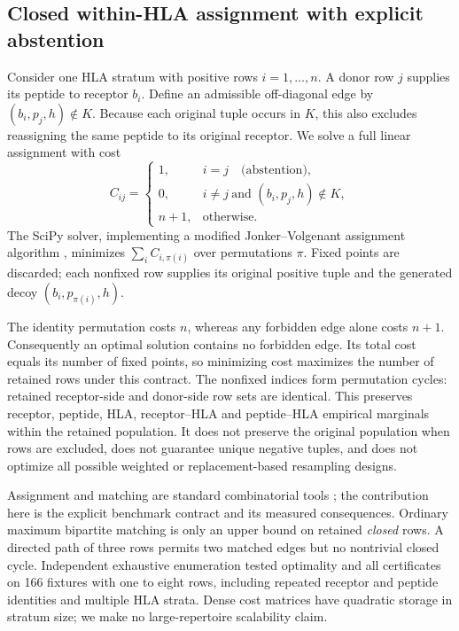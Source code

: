 \documentclass[pdflatex,sn-basic,Numbered]{sn-jnl}
\begin{document}
\subsection{Closed within-HLA assignment with explicit abstention}
Consider one HLA stratum with positive rows $i=1,\ldots,n$. A donor row $j$ supplies its peptide to receptor $b_i$. Define an admissible off-diagonal edge by $(b_i,p_j,h)\notin K$. Because each original tuple occurs in $K$, this also excludes reassigning the same peptide to its original receptor. We solve a full linear assignment with cost
\begin{equation}
C_{ij}=\begin{cases}
1, & i=j\quad\text{(abstention)},\\
0, & i\ne j\ \text{and }(b_i,p_j,h)\notin K,\\
n+1, & \text{otherwise}.
\end{cases}
\label{eq:assignment}
\end{equation}
The SciPy solver, implementing a modified Jonker--Volgenant assignment algorithm \cite{Crouse2016}, minimizes $\sum_i C_{i,\pi(i)}$ over permutations $\pi$. Fixed points are discarded; each nonfixed row supplies its original positive tuple and the generated decoy $(b_i,p_{\pi(i)},h)$.

The identity permutation costs $n$, whereas any forbidden edge alone costs $n+1$. Consequently an optimal solution contains no forbidden edge. Its total cost equals its number of fixed points, so minimizing cost maximizes the number of retained rows under this contract. The nonfixed indices form permutation cycles: retained receptor-side and donor-side row sets are identical. This preserves receptor, peptide, HLA, receptor--HLA and peptide--HLA empirical marginals within the retained population. It does not preserve the original population when rows are excluded, does not guarantee unique negative tuples, and does not optimize all possible weighted or replacement-based resampling designs.

Assignment and matching are standard combinatorial tools \cite{Hall1935}; the contribution here is the explicit benchmark contract and its measured consequences. Ordinary maximum bipartite matching is only an upper bound on retained \emph{closed} rows. A directed path of three rows permits two matched edges but no nontrivial closed cycle. Independent exhaustive enumeration tested optimality and all certificates on 166 fixtures with one to eight rows, including repeated receptor and peptide identities and multiple HLA strata. Dense cost matrices have quadratic storage in stratum size; we make no large-repertoire scalability claim.
\end{document}
